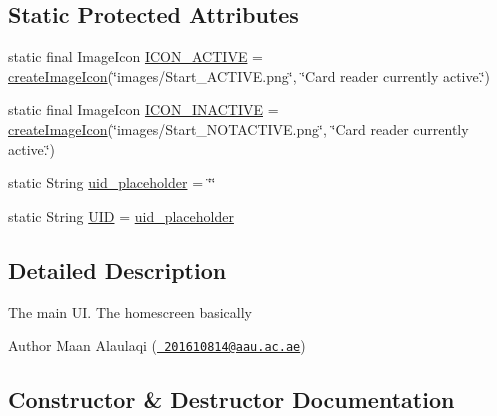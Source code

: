 \subsection*{Static Protected Attributes}
\begin{DoxyCompactItemize}
\item 
static final Image\+Icon \mbox{\hyperlink{classams_1_1_user_interface_aa059c1bdd7d1c11ee0930e7da113a836}{I\+C\+O\+N\+\_\+\+A\+C\+T\+I\+VE}} = \mbox{\hyperlink{classams_1_1_user_interface_ab22216d30202f196e243447004ef51cd}{create\+Image\+Icon}}(\char`\"{}images/Start\+\_\+\+A\+C\+T\+I\+V\+E.\+png\char`\"{}, \char`\"{}Card reader currently active.\char`\"{})
\item 
static final Image\+Icon \mbox{\hyperlink{classams_1_1_user_interface_a77dfb30596c6419c587d65748c969b4f}{I\+C\+O\+N\+\_\+\+I\+N\+A\+C\+T\+I\+VE}} = \mbox{\hyperlink{classams_1_1_user_interface_ab22216d30202f196e243447004ef51cd}{create\+Image\+Icon}}(\char`\"{}images/Start\+\_\+\+N\+O\+T\+A\+C\+T\+I\+V\+E.\+png\char`\"{}, \char`\"{}Card reader currently active.\char`\"{})
\item 
static String \mbox{\hyperlink{classams_1_1_user_interface_a89f889d43e99ec32651d1e735f7c8621}{uid\+\_\+placeholder}} = \char`\"{}\char`\"{}
\item 
static String \mbox{\hyperlink{classams_1_1_user_interface_a4220d2d966388244f998d042249a71fc}{U\+ID}} = \mbox{\hyperlink{classams_1_1_user_interface_a89f889d43e99ec32651d1e735f7c8621}{uid\+\_\+placeholder}}
\end{DoxyCompactItemize}


\subsection{Detailed Description}
The main UI. The homescreen basically

\begin{DoxyAuthor}{Author}
Maan Alaulaqi (\href{mailto:201610814@aau.ac.ae}{\texttt{ 201610814@aau.\+ac.\+ae}}) 
\end{DoxyAuthor}


\subsection{Constructor \& Destructor Documentation}
\mbox{\label{classams_1_1_user_interface_aee729eb579067256175a86f3da2e37bc}} 
